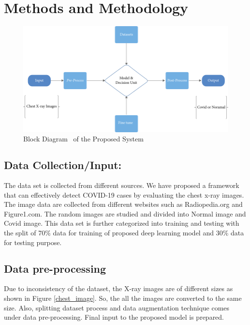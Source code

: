 \section{Methods and Methodology}

\begin{figure}[!h]
    \centering
        \includegraphics{assets/block.png}
    \caption{Block Diagram~\cite{Uddin2021} of the Proposed System}
\end{figure}

\subsection{Data Collection/Input:}

The data set is collected from different sources. We have proposed a framework that can effectively detect COVID-19 cases by evaluating the chest x-ray images. The image data are collected from different websites such as Radiopedia.org and Figure1.com. The random images are studied and divided into Normal image and Covid image. This data set is further categorized into training and testing with the split of 70\% data for training of proposed deep learning model and 30\% data for testing purpose. 

\subsection{Data pre-processing }

Due to inconsistency of the dataset, the X-ray images are of different sizes as shown in Figure \ref{chest_image}. So, the all the images are converted to the same size. Also, splitting dataset process and data augmentation technique comes under data pre-processing. Final input to the proposed model is prepared. 

